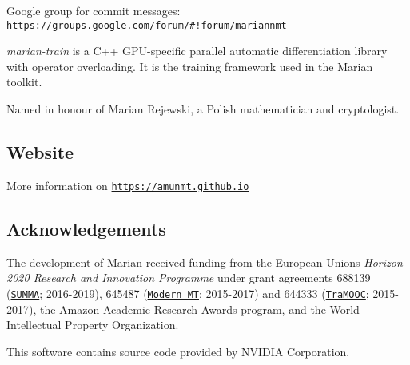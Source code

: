 \href{https://gitter.im/amunmt/marian?utm_source=badge&utm_medium=badge&utm_campaign=pr-badge&utm_content=badge}{\tt } \href{http://vali.inf.ed.ac.uk/jenkins/job/marian-train/}{\tt }

Google group for commit messages\+: \href{https://groups.google.com/forum/#!forum/mariannmt}{\tt https\+://groups.\+google.\+com/forum/\#!forum/mariannmt}

{\itshape marian-\/train} is a C++ G\+P\+U-\/specific parallel automatic differentiation library with operator overloading. It is the training framework used in the Marian toolkit.

Named in honour of Marian Rejewski, a Polish mathematician and cryptologist.

\subsection*{Website}

More information on \href{https://amunmt.github.io}{\tt https\+://amunmt.\+github.\+io}

\subsection*{Acknowledgements}

The development of Marian received funding from the European Union\textquotesingle{}s {\itshape Horizon 2020 Research and Innovation Programme} under grant agreements 688139 (\href{http://www.summa-project.eu}{\tt S\+U\+M\+MA}; 2016-\/2019), 645487 (\href{http://www.modernmt.eu}{\tt Modern MT}; 2015-\/2017) and 644333 (\href{http://tramooc.eu/}{\tt Tra\+M\+O\+OC}; 2015-\/2017), the Amazon Academic Research Awards program, and the World Intellectual Property Organization.

This software contains source code provided by N\+V\+I\+D\+IA Corporation. 